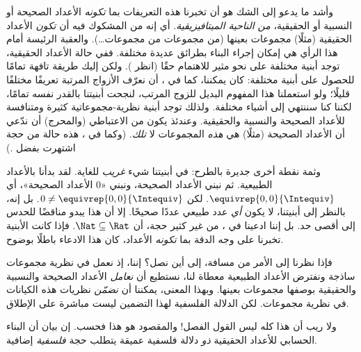 \documentclass[../../../include/open-logic-section]{subfiles}
\begin{document}
وأشد ما يدعو إلى الشك هو أن تخبرنا هذه التعريفات بما \emph{تكونه}
الأعداد الصحيحة أو النسبية أو الحقيقية، \emph{من الناحية
الميتافيزيقية}. أي إنه من المشكوك فيه أن \emph{تكون} الأعداد الحقيقية
(مثلًا) مجموعات بعينها (من مجموعات من مجموعات\ldots). والعقبة الرئيسة
أمام هذا الرأي هي إمكان إجراء البناء بطرائق عديدة مختلفة. ففي حالة
الأعداد الحقيقية، توجد أبنية مختلفة على نحو مثير للاهتمام حقًا (انظر
). ولكن إليك طريقة تافهة تمامًا للحصول على أبنية
مختلفة: كان يمكننا، كما في ، أن نعرّف الأزواج
المرتبة تعريفًا مختلفًا قليلًا؛ ولو استعملنا هذا المفهوم البديل للزوج
المرتب، لنجحت أبنيتنا بالقدر نفسه تمامًا، لكننا كنا سننتهي إلى أشياء
مختلفة. ولذلك توجد أبنية نظرية-مجموعاتية كثيرة ومتنافسة للأعداد الصحيحة
والنسبية والحقيقية. وعندئذ يكون من الاعتباطي (والمحرج) أن ندّعي أن
الأعداد الصحيحة (مثلًا) هي \emph{هذه} المجموعات لا \emph{تلك}.
(وكما في ، هذه حالة من حجة اشتهرت بفضل
\citealt{Benacerraf1965}.)

وثمة نقطة أخرى جديرة بالطرح: في أبنيتنا شيء \emph{غريب} للغاية. لقد
بدأنا بالأعداد الطبيعية. ثم نبني الأعداد الصحيحة، ونبني «$0$ الأعداد
الصحيحة»، أي $ \equivrep{0,0}{\Intequiv}$. لكن $0 \neq
\equivrep{0,0}{\Intequiv}$. بل إنه، بالنظر إلى أبنيتنا، لا يكون
\emph{أي} عدد طبيعي عددًا صحيحًا. إلا أن هذا يبدو مناقضًا للحدس إلى
أقصى حد. بل إننا ادعينا في ، من غير كثير
حجة، أن $\Nat \subseteq \Rat$. فإذا كانت الأبنية تخبرنا على وجه الدقة
بما \emph{تكونه} الأعداد، كان هذا الادعاء باطلًا بوضوح.

فإذا نظرنا إلى الأمر من مسافة، إلى أين نصل؟ إننا، إذ نعمل في نظرية
مجموعات ساذجة ونفترض الأعداد الطبيعية معطاة لنا، نستطيع أن
\emph{نعامل} الأعداد الصحيحة والنسبية والحقيقية بوصفها مجموعات بعينها.
وبهذا المعنى، يمكننا أن \emph{نضمّن} نظريات هذه الكيانات في نظرية
مجموعات. لكن الدلالة الفلسفية لهذا التضمين ليست مباشرة على الإطلاق.

ولا ريب أن هذا كله ليس القول الفصل!{} والمقصود هو هذا فحسب. إن بيان أن
البناء الحسابي للأعداد الحقيقية \emph{ذو} دلالة فلسفية عميقة يتطلب
حجة \emph{فلسفية} إضافية.

\end{document}
